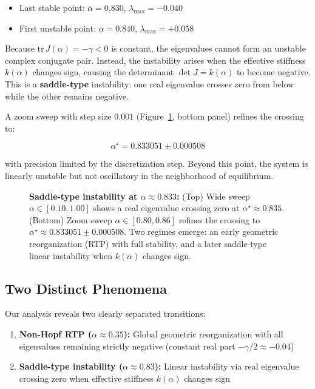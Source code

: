 \documentclass[11pt,twocolumn]{article}
\begin{document}
\begin{itemize}
  \item Last stable point: $\alpha = 0.830$, $\lambda_{\text{max}} = -0.040$
  \item First unstable point: $\alpha = 0.840$, $\lambda_{\text{max}} = +0.058$
\end{itemize}

Because $\mathrm{tr}\,J(\alpha) = -\gamma < 0$ is constant, the eigenvalues cannot form an unstable complex
conjugate pair. Instead, the instability arises when the effective stiffness $k(\alpha)$ changes sign,
causing the determinant $\det J = k(\alpha)$ to become negative. This is a \textbf{saddle-type} instability:
one real eigenvalue crosses zero from below while the other remains negative.

A zoom sweep with step size $0.001$ (Figure~\ref{fig:eigs-wide-zoom}, bottom panel) refines the crossing to:

\begin{equation}
  \alpha^\star = 0.833051 \pm 0.000508
\end{equation}

with precision limited by the discretization step. Beyond this point, the system is linearly unstable but
not oscillatory in the neighborhood of equilibrium.

\begin{figure}[t]
  \centering
  
  \vspace{0.4em}
  
  \caption{%
  \textbf{Saddle-type instability at $\alpha\approx0.833$:} (Top) Wide sweep $\alpha\in[0.10,1.00]$ shows
  a real eigenvalue crossing zero at $\alpha^\star\approx0.835$. (Bottom) Zoom sweep $\alpha\in[0.80,0.86]$
  refines the crossing to $\alpha^\star\approx0.833051\pm0.000508$. Two regimes emerge: an early geometric
  reorganization (RTP) with full stability, and a later saddle-type linear instability when $k(\alpha)$ changes sign.
  }
  \label{fig:eigs-wide-zoom}
\end{figure}

\subsection{Two Distinct Phenomena}

Our analysis reveals two clearly separated transitions:

\begin{enumerate}
  \item \textbf{Non-Hopf RTP ($\alpha \approx 0.35$):} Global geometric reorganization with all eigenvalues remaining strictly negative (constant real part $-\gamma/2 \approx -0.04$)
  \item \textbf{Saddle-type instability ($\alpha \approx 0.83$):} Linear instability via real eigenvalue crossing zero when effective stiffness $k(\alpha)$ changes sign
\end{enumerate}
\end{document}
